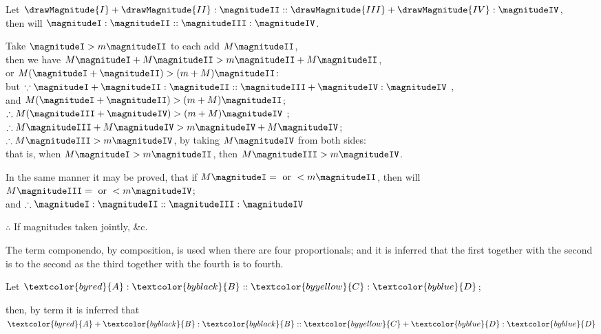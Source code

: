 \begin{center}
Let $\drawMagnitude{I} + \drawMagnitude{II} : \magnitudeII :: \drawMagnitude{III} + \drawMagnitude{IV} : \magnitudeIV$,\\
then will $\magnitudeI : \magnitudeII :: \magnitudeIII : \magnitudeIV$.

Take $\magnitudeI > m \magnitudeII$ to each add $M \magnitudeII$,\\
then we have $M \magnitudeI + M \magnitudeII > m \magnitudeII + M \magnitudeII$,\\
or $M (\magnitudeI + \magnitudeII) > (m + M) \magnitudeII$:\\
but $\because \magnitudeI + \magnitudeII: \magnitudeII :: \magnitudeIII + \magnitudeIV: \magnitudeIV$ \bycref{\hypref},\\ %
and $M (\magnitudeI + \magnitudeII) > (m + M) \magnitudeII$;\\
$\therefore M(\magnitudeIII + \magnitudeIV) > (m + M) \magnitudeIV$ ;\\
$\therefore M \magnitudeIII + M \magnitudeIV > m \magnitudeIV + M \magnitudeIV$;\\
$\therefore M \magnitudeIII > m \magnitudeIV$, by taking $M \magnitudeIV$ from both sides:\\
that is, when $M \magnitudeI > m \magnitudeII$, then $M \magnitudeIII > m \magnitudeIV$.

In the same manner it may be proved, that if $M \magnitudeI = \mbox{ or } < m \magnitudeII$, then will $M \magnitudeIII = \mbox{ or } < m \magnitudeIV$;\\
and $\therefore \magnitudeI : \magnitudeII :: \magnitudeIII : \magnitudeIV$ 

$\therefore$ If magnitudes taken jointly, \&c.
\end{center}


\vfill\pagebreak

\label{def:V.XV} 
\def\varA{\textcolor{byred}{A}}
\def\varB{\textcolor{byblack}{B}}
\def\varC{\textcolor{byyellow}{C}}
\def\varD{\textcolor{byblue}{D}}
The term componendo, by composition, is used when there are four proportionals; and it is inferred that the first together with the second is to the second as the third together with the fourth is to fourth.

\begin{center}
Let $\varA : \varB :: \varC : \varD$;

then, by term  it is inferred that\\
$\varA + \varB : \varB :: \varC + \varD: \varD$
\end{center}

